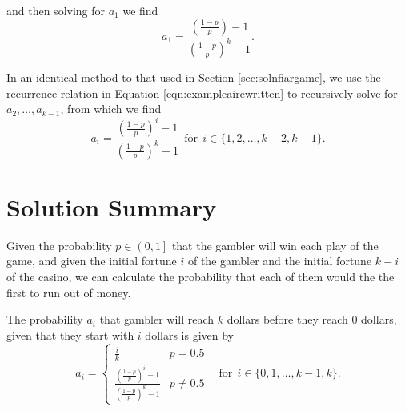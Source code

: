 \documentclass[a4paper,11pt]{article}
\begin{document}
and then solving for $a_1$ we find
\begin{equation}
a_1 = \frac{ \left(\frac{1-p}{p}\right) - 1 }{ \left(\frac{1-p}{p}\right)^k - 1 }.
\end{equation}

In an identical method to that used in Section \ref{sec:solnfiargame}, we use the recurrence relation in Equation \ref{eqn:exampleairewritten} to recursively solve for $a_2, \ldots, a_{k-1}$, from which we find
\begin{equation}
a_i = \frac{ \left(\frac{1-p}{p}\right)^i - 1 }{ \left(\frac{1-p}{p}\right)^k - 1 } \ \ \mathrm{for} \ \ i \in \{ 1, 2, \ldots, k-2, k-1 \}.
\end{equation}

\section{Solution Summary}

Given the probability $p\in\left(0,1\right]$ that the gambler will win each play of the game, and given the initial fortune $i$ of the gambler and the initial fortune $k-i$ of the casino, we can calculate the probability that each of them would the the first to run out of money.

The probability $a_i$ that gambler will reach $k$ dollars before they reach 0 dollars, given that they start with $i$ dollars is given by
\begin{equation}
a_i =
\begin{cases}
\frac{i}{k} & p=0.5\\
\frac{ \left(\frac{1-p}{p}\right)^i - 1 }{ \left(\frac{1-p}{p}\right)^k - 1 } & p\neq0.5
\end{cases} \ \ \ \ \mathrm{for} \ \ i \in \{ 0, 1, \ldots, k-1, k \}.
\end{equation}
\end{document}
